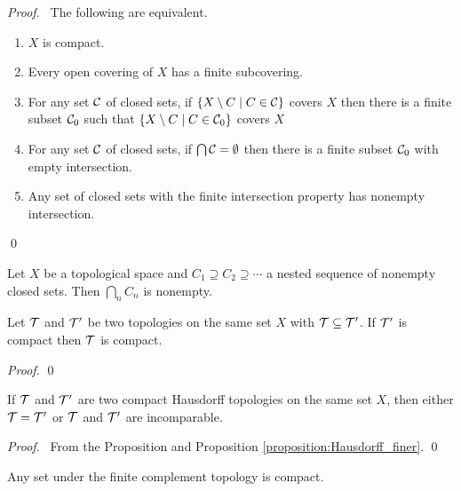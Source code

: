 \begin{proof}
    \pf\ The following are equivalent.
    \begin{enumerate}
        \item $X$ is compact.
        \item Every open covering of $X$ has a finite subcovering.
        \item For any set $\mathcal{C}$ of closed sets, if $\{ X \setminus C \mid C \in \mathcal{C} \}$ covers $X$ then there is a finite subset $\mathcal{C}_0$ such that
        $\{ X \setminus C \mid C \in \mathcal{C}_0 \}$ covers $X$
        \item For any set $\mathcal{C}$ of closed sets, if $\bigcap \mathcal{C} = \emptyset$ then there is a finite subset $\mathcal{C}_0$ with empty intersection.
        \item Any set of closed sets with the finite intersection property has nonempty intersection.
    \end{enumerate}
    \qed
\end{proof}

\begin{corollary}
    \label{corollary:nested_intersection}
    Let $X$ be a topological space and $C_1 \supseteq C_2 \supseteq \cdots$ a nested sequence of nonempty closed sets. Then $\bigcap_n C_n$ is nonempty.
\end{corollary}

\begin{proposition}
    Let $\mathcal{T}$ and $\mathcal{T}'$ be two topologies on the same set $X$ with $\mathcal{T} \subseteq \mathcal{T}'$. If $\mathcal{T}'$ is compact then $\mathcal{T}$ is compact.
\end{proposition}

\begin{proof}
    \pf
    \qed
\end{proof}

\begin{corollary}
    If $\mathcal{T}$ and $\mathcal{T}'$ are two compact Hausdorff topologies on the same set $X$, then either $\mathcal{T} = \mathcal{T}'$ or $\mathcal{T}$ and $\mathcal{T}'$ are incomparable.
\end{corollary}

\begin{proof}
    \pf\ From the Proposition and Proposition \ref{proposition:Hausdorff_finer}. \qed
\end{proof}

\begin{example}
    Any set under the finite complement topology is compact.
\end{example}

